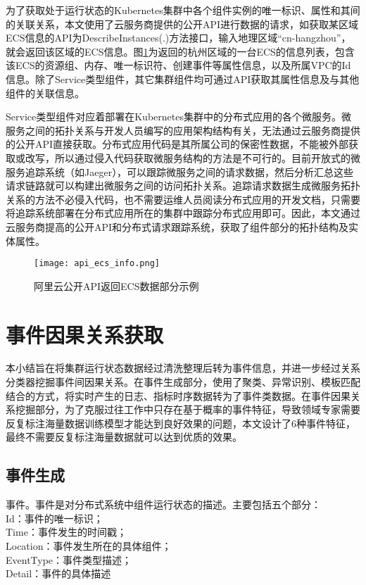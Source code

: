 为了获取处于运行状态的Kubernetes集群中各个组件实例的唯一标识、属性和其间的关联关系，本文使用了云服务商提供的公开API进行数据的请求，如获取某区域ECS信息的API为DescribeInstances(.)方法接口，输入地理区域“cn-hangzhou”，就会返回该区域的ECS信息。图\ref{api_ecs_info}为返回的杭州区域的一台ECS的信息列表，包含该ECS的资源组、内存、唯一标识符、创建事件等属性信息，以及所属VPC的Id信息。除了Service类型组件，其它集群组件均可通过API获取其属性信息及与其他组件的关联信息。

Service类型组件对应着部署在Kubernetes集群中的分布式应用的各个微服务。微服务之间的拓扑关系与开发人员编写的应用架构结构有关，无法通过云服务商提供的公开API直接获取。分布式应用代码是其所属公司的保密性数据，不能被外部获取或改写，所以通过侵入代码获取微服务结构的方法是不可行的。目前开放式的微服务追踪系统（如Jaeger\cite{mengistu2020distributed}），可以跟踪微服务之间的请求数据，然后分析汇总这些请求链路就可以构建出微服务之间的访问拓扑关系。追踪请求数据生成微服务拓扑关系的方法不必侵入代码，也不需要运维人员阅读分布式应用的开发文档，只需要将追踪系统部署在分布式应用所在的集群中跟踪分布式应用即可。因此，本文通过云服务商提高的公开API和分布式请求跟踪系统，获取了组件部分的拓扑结构及实体属性。
\begin{figure}[htbp]
    \centering
    \texttt{[image: api\_ecs\_info.png]}
    \caption{阿里云公开API返回ECS数据部分示例\label{api_ecs_info}}
\end{figure}

\section{事件因果关系获取}
本小结旨在将集群运行状态数据经过清洗整理后转为事件信息，并进一步经过关系分类器挖掘事件间因果关系。在事件生成部分，使用了聚类、异常识别、模板匹配结合的方式，将实时产生的日志、指标时序数据转为了事件类数据。在事件因果关系挖掘部分，为了克服过往工作中只存在基于概率的事件特征，导致领域专家需要反复标注海量数据训练模型才能达到良好效果的问题，本文设计了6种事件特征，最终不需要反复标注海量数据就可以达到优质的效果。
\subsection{事件生成}
\begin{definition}[事件]
    \label{event-define}
    事件。事件是对分布式系统中组件运行状态的描述。主要包括五个部分：
    {\\\qquad
        Id：事件的唯一标识；\\
        Time：事件发生的时间戳；\\\qquad
        Location：事件发生所在的具体组件；\\\qquad
        EventType：事件类型描述；\\\qquad
        Detail：事件的具体描述\\\qquad
    }
\end{definition}

